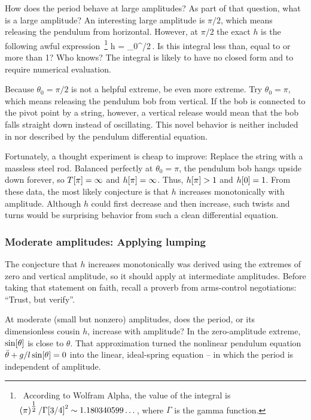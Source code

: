 How does the period behave at large amplitudes? As part of that question, what is a large amplitude? An interesting large amplitude is $\pi/2$, which means releasing the pendulum from horizontal. However, at $\pi/2$ the exact $h$ is the following awful expression~\footnote{~According to Wolfram Alpha, the value of the integral is $\left({\pi}\right)^{\tfrac{1}{2}}/\Gamma\!\left[{3/4}\right]^2\sim 1.180340599\dots$, where $\Gamma$ is the gamma function.}
\beq
h = \int_{0}^{\pi/2}\dfrac{\dx\theta}{\sqrt{\cos\vat\theta}}\,.
\eeq
Is this integral less than, equal to or more than 1? Who knows? The integral is likely to have no closed form and to require numerical evaluation.

Because $\theta_0 = \pi/2$ is not a helpful extreme, be even more extreme. Try $\theta_0 = \pi$, which means releasing the pendulum bob from vertical. If the bob is connected to the pivot point by a string, however, a vertical release would mean that the bob falls straight down instead of oscillating. This novel behavior is neither included in nor described by the pendulum differential equation.

Fortunately, a thought experiment is cheap to improve: Replace the string with a massless steel
rod. Balanced perfectly at $\theta_0 = \pi$, the pendulum bob hangs upside down forever, so $T\!\left[{\pi}\right] = \infty$ and $h\!\left[{\pi}\right] = \infty$. Thus, $h\!\left[{\pi}\right] > 1$ and $h\!\left[{0}\right] = 1$. From these data, the most likely conjecture is that $h$ increases monotonically with amplitude. Although $h$ could first decrease and then increase, such twists and turns would be surprising behavior from such a clean differential equation.


\subsubsection{Moderate amplitudes: Applying lumping}
The conjecture that $h$ increases monotonically was derived using the extremes of zero and vertical amplitude, so it should apply at intermediate amplitudes. Before taking that statement on faith, recall a proverb from arms-control negotiations: ``Trust, but verify''.

At moderate (small but nonzero) amplitudes, does the period, or its dimensionless cousin $h$, increase with amplitude? In the zero-amplitude extreme, $\sin\!\left[{\theta}\right]$ is close to $\theta$. That approximation turned the nonlinear pendulum equation $\ddot{\theta} + g/l\sin\!\left[{\theta}\right] = 0$ into the linear, ideal-spring equation -- in which the period is independent of amplitude.

